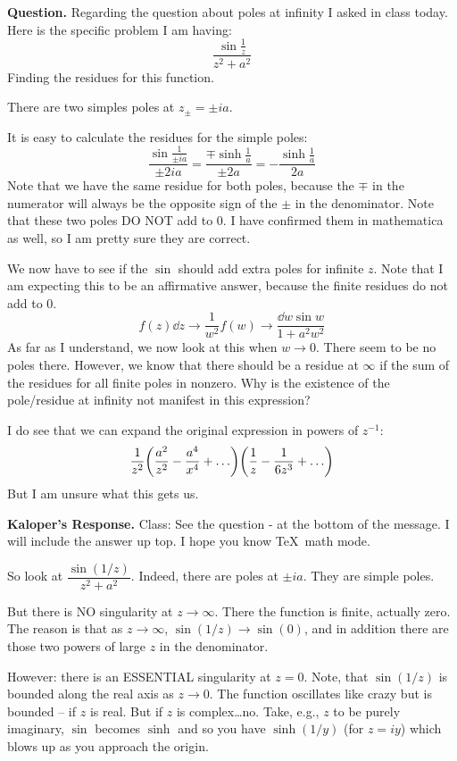 \documentclass{article}
\begin{document}
\textbf{Question.} Regarding the question about poles at infinity I asked in class today. Here is the specific problem I am having:
\[
\frac{\sin\frac{1}{z}}{z^2+a^2}
\]
Finding the residues for this function.

There are two simples poles at $z_\pm = \pm ia$. 
               
It is easy to calculate the residues for the simple poles:
\[                          
\frac{\sin\frac{1}{\pm ia}}{\pm 2ia} =\frac{\mp\sinh\frac{1}{a}}{\pm 2a} = -\frac{\sinh\frac{1}{a}}{2a}
\]
Note that we have the same residue for both poles, because the $\mp$ in the numerator will always be the opposite sign of the $\pm$ in the denominator. Note that these two poles DO NOT add to 0. I have confirmed them in mathematica as well, so I am pretty sure they are correct.

We now have to see if the $\sin$ should add extra poles for infinite $z$. Note that I am expecting this to be an affirmative answer, because the finite residues do not add to 0. 
\[             
f(z)\dd{z} \to \frac{1}{w^2}f(w) \to \frac{\dd{w}\sin w}{1+ a^2w^2}
\]
As far as I understand, we now look at this when $w\to 0$. There seem to be no poles there. However, we know that there should be a residue at $\infty$ if the sum of the residues for all finite poles in nonzero. Why is the existence of the pole/residue at infinity not manifest in this expression?

I do see that we can expand the original expression in powers of $z^{-1}$:
\[
\frac{1}{z^2} \pqty{\frac{a^2}{z^2} - \frac{a^4}{x^4}+\ldots}\pqty{\frac{1}{z} - \frac{1}{6z^3}+\ldots}
\]
But I am unsure what this gets us.

\textbf{Kaloper's Response.} Class: See the question - at the bottom of the message. I will include the answer up top. I hope you know \TeX\ math mode.

So look at $\dfrac{\sin(1/z)}{z^2+a^2}$. Indeed, there are poles at $\pm i a$. They are simple poles.

But there is NO singularity at $z\to\infty$. There the function is finite, actually zero. The reason is that as $z\to\infty$, $\sin(1/z)\to\sin(0)$, and in addition there are those two powers of large $z$ in the denominator. 

However: there is an ESSENTIAL singularity at $z=0$. Note, that $\sin(1/z)$ is bounded along the real axis as $z \rightarrow 0$. The function oscillates like crazy but is bounded -- if $z$ is real. But if $z$ is complex\ldots no. Take, e.g., $z$ to be purely imaginary, $\sin$ becomes $\sinh$ and so you have $\sinh(1/y)$ (for $z=iy$) which blows up as you approach the origin.
\end{document}
